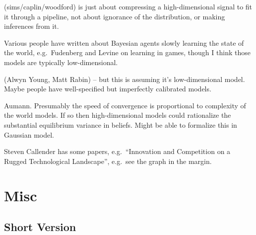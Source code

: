 \documentclass[
  10pt,
  letterpaper,
  DIV=11,
  numbers=noendperiod,
  oneside]{scrartcl}
\providecommand{\tightlist}{%
  \setlength{\itemsep}{0pt}\setlength{\parskip}{0pt}}\usepackage{longtable,booktabs,array}
\begin{document}
\begin{description}
\tightlist
\item[Rational inattention.]
(sims/caplin/woodford) is just about compressing a high-dimensional
signal to fit it through a pipeline, not about ignorance of the
distribution, or making inferences from it.
\item[Learning in games.]
Various people have written about Bayesian agents slowly learning the
state of the world, e.g.~Fudenberg and Levine on learning in games,
though I think those models are typically low-dimensional.
\item[Misspecified models.]
(Alwyn Young, Matt Rabin) -- but this is assuming it's low-dimensional
model. Maybe people have well-specified but imperfectly calibrated
models.
\item[Agreeing to disagree.]
Aumann. Presumably the speed of convergence is proportional to
complexity of the world models. If so then high-dimensional models could
rationalize the substantial equilibrium variance in beliefs. Might be
able to formalize this in Gaussian model.
\end{description}


\begin{description}
\tightlist
\item[Rugged landscape.]
Steven Callender has some papers, e.g.~``Innovation and Competition on a
Rugged Technological Landscape'', e.g.~see the graph in the margin.
\end{description}

\section{Misc}\label{misc-1}

\subsection{Short Version}\label{short-version}
\end{document}
